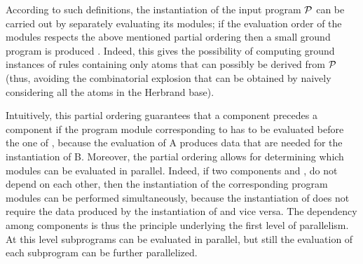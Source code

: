 \documentclass[preprint]{tlp}
\newcommand{\p}{\ensuremath{{\cal P}}\xspace}
\begin{document}
According to such definitions, the instantiation of the input
program \p can be carried out by separately evaluating its modules;
if the evaluation order of the modules respects the above mentioned
partial ordering then a small ground program is produced \cite{cali-etal-2008-joacil}. Indeed,
this gives the possibility of computing ground instances of rules
containing only atoms that can possibly be derived from \p
(thus, avoiding the combinatorial explosion that can be obtained by
naively considering all the atoms in the Herbrand base).

Intuitively, this partial ordering guarantees that a component 
precedes a component  if the program module corresponding to 
has to be evaluated before the one of , because the evaluation of
A produces data that are needed for the instantiation of B.
Moreover, the partial ordering allows for determining which modules
can be evaluated in parallel. Indeed, if two components  and ,
do not depend on each other, then the instantiation of the
corresponding program modules can be performed simultaneously,
because the instantiation of  does not require the data produced
by the instantiation of  and vice versa.
The dependency among components is thus the principle underlying the
first level of parallelism. At this level subprograms can be
evaluated in parallel, but still the evaluation of each subprogram
can be further parallelized.
\end{document}
